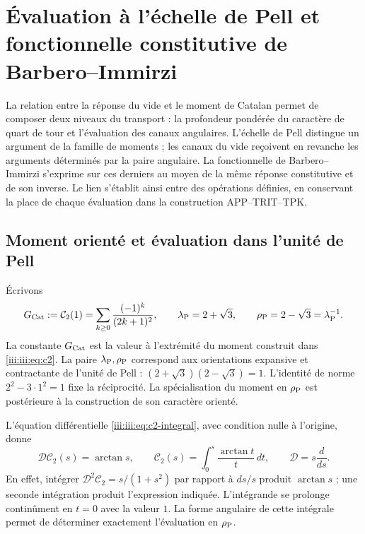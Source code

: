 \section{Évaluation à l’échelle de Pell et fonctionnelle constitutive de Barbero--Immirzi}
\label{iii:iii:sec:pell-barbero}

La relation entre la réponse du vide et le moment de Catalan permet
de composer deux niveaux du transport : la profondeur pondérée du caractère
de quart de tour et l’évaluation des canaux angulaires. L’échelle de
Pell distingue un argument de la famille de moments ; les canaux du
vide reçoivent en revanche les arguments déterminés par la paire angulaire.
La fonctionnelle de Barbero--Immirzi s’exprime sur ces derniers au moyen de
la même réponse constitutive et de son inverse. Le lien s’établit ainsi
entre des opérations définies, en conservant la place de chaque évaluation
dans la construction APP--TRIT--TPK.

\subsection{Moment orienté et évaluation dans l’unité de Pell}

Écrivons
\begin{equation}
 G_{\rm Cat}:=\mathcal C_2(1)
 =\sum_{k\geq0}\frac{(-1)^k}{(2k+1)^2},\qquad
 \lambda_{\rm P}=2+\sqrt3,\qquad
 \rho_{\rm P}=2-\sqrt3=\lambda_{\rm P}^{-1}.
 \label{iii:iii:eq:pell-scales}
\end{equation}
La constante $G_{\rm Cat}$ est la valeur à l’extrémité du moment construit dans
\eqref{iii:iii:eq:c2}. La paire $\lambda_{\rm P},\rho_{\rm P}$ correspond aux
orientations expansive et contractante de l’unité de Pell :
$(2+\sqrt3)(2-\sqrt3)=1$. L’identité de norme $2^2-3\cdot1^2=1$
fixe la réciprocité. La spécialisation du moment en $\rho_{\rm P}$
est postérieure à la construction de son caractère orienté.

L’équation différentielle \eqref{iii:iii:eq:c2-integral}, avec condition nulle
à l’origine, donne
\begin{equation}
 \mathcal D\mathcal C_2(s)=\arctan s,\qquad
 \mathcal C_2(s)=\int_0^s\frac{\arctan t}{t}\,dt,
 \qquad \mathcal D=s\frac{d}{ds}.
 \label{iii:iii:eq:pell-moment-integral}
\end{equation}
En effet, intégrer $\mathcal D^2\mathcal C_2=s/(1+s^2)$ par rapport à
$ds/s$ produit $\arctan s$ ; une seconde intégration produit l’expression
indiquée. L’intégrande se prolonge continûment en $t=0$ avec la valeur $1$.
La forme angulaire de cette intégrale permet de déterminer exactement
l’évaluation en $\rho_{\rm P}$.

